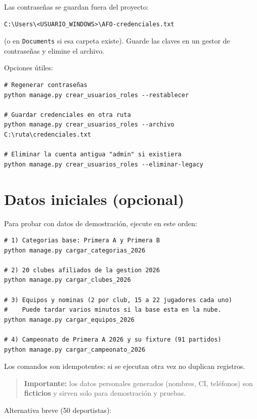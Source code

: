 \documentclass[11pt,a4paper]{article}
\newcommand{\campo}[1]{\texttt{\small #1}}
\begin{document}
Las contraseñas se guardan fuera del proyecto:

\begin{lstlisting}
C:\Users\<USUARIO_WINDOWS>\AFO-credenciales.txt
\end{lstlisting}

(o en \campo{Documents} si esa carpeta existe). Guarde las claves en un gestor de
contraseñas y elimine el archivo.

Opciones útiles:

\begin{lstlisting}
# Regenerar contraseñas
python manage.py crear_usuarios_roles --restablecer

# Guardar credenciales en otra ruta
python manage.py crear_usuarios_roles --archivo C:\ruta\credenciales.txt

# Eliminar la cuenta antigua "admin" si existiera
python manage.py crear_usuarios_roles --eliminar-legacy
\end{lstlisting}

\section{Datos iniciales (opcional)}

Para probar con datos de demostración, ejecute en este orden:

\begin{lstlisting}
# 1) Categorias base: Primera A y Primera B
python manage.py cargar_categorias_2026

# 2) 20 clubes afiliados de la gestion 2026
python manage.py cargar_clubes_2026

# 3) Equipos y nominas (2 por club, 15 a 22 jugadores cada uno)
#    Puede tardar varios minutos si la base esta en la nube.
python manage.py cargar_equipos_2026

# 4) Campeonato de Primera A 2026 y su fixture (91 partidos)
python manage.py cargar_campeonato_2026
\end{lstlisting}

Los comandos son idempotentes: si se ejecutan otra vez no duplican registros.

\begin{quote}
\textbf{Importante:} los datos personales generados (nombres, CI, teléfonos) son
\textbf{ficticios} y sirven solo para demostración y pruebas.
\end{quote}

Alternativa breve (50 deportistas):
\end{document}
